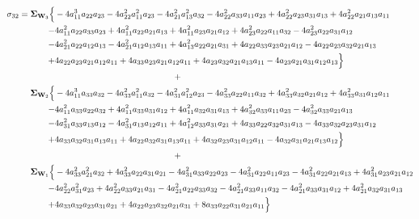 \documentclass{article}
\begin{document}
\begin{equation}
\begin{aligned}
\sigma_{32} =  \mathbf{\Sigma}_{\textbf{W}_{3}} \Bigl\{ & -4 a_{11}^{3} a_{22} a_{23} - 4 a_{22}^{2} a_{11}^{2} a_{23} - 4 a_{21}^{2} a_{13}^{2} a_{32} - 4 a_{22}^{2} a_{33} a_{11} a_{23} + 4 a_{22}^{2} a_{23} a_{31} a_{13} + 4 a_{22}^{2} a_{21} a_{13} a_{11} \\
-&4 a_{11}^{2} a_{22} a_{33} a_{23} + 4 a_{11}^{2} a_{22} a_{21} a_{13} + 4 a_{11}^{2} a_{23} a_{21} a_{12} + 4 a_{23}^{2} a_{22} a_{11} a_{32} - 4a_{23}^{2} a_{22} a_{31} a_{12} \\
-&4 a_{21}^{2} a_{22} a_{12} a_{13} - 4 a_{21}^{2} a_{12} a_{13} a_{11} + 4 a_{13}^{2} a_{22} a_{21} a_{31} + 4 a_{22} a_{33} a_{23} a_{21} a_{12} - 4 a_{22} a_{23}a_{32} a_{21} a_{13} \\
+&4 a_{22} a_{23} a_{21} a_{12} a_{11} + 4 a_{33} a_{23} a_{21} a_{12} a_{11} + 4 a_{23} a_{32} a_{21} a_{13} a_{11} - 4 a_{23} a_{21} a_{31} a_{12} a_{13}\Bigr\} \\
& \qquad \qquad \qquad \qquad \qquad \qquad \qquad + \\
\mathbf{\Sigma}_{\textbf{W}_{2}} \Bigl\{& -4 a_{11}^{3} a_{33} a_{32} - 4 a_{33}^{2} a_{11}^{2} a_{32} - 4 a_{31}^{2} a_{12}^{2} a_{23} - 4 a_{33}^{2} a_{22} a_{11} a_{32} + 4 a_{33}^{2} a_{32} a_{21} a_{12} + 4 a_{33}^{2} a_{31} a_{12} a_{11} \\
-&4 a_{11}^{2} a_{33} a_{22} a_{32} + 4 a_{11}^{2} a_{33} a_{31} a_{12} + 4 a_{11}^{2} a_{32} a_{31} a_{13} + 4 a_{32}^{2} a_{33} a_{11} a_{23} - 4 a_{32}^{2} a_{33} a_{21} a_{13} \\
-&4 a_{31}^{2} a_{33} a_{13} a_{12} - 4 a_{31}^{2} a_{13} a_{12} a_{11} + 4 a_{12}^{2} a_{33} a_{31} a_{21} + 4 a_{33} a_{22} a_{32} a_{31} a_{13} - 4 a_{33} a_{32} a_{23} a_{31} a_{12} \\
+&4 a_{33} a_{32} a_{31} a_{13} a_{11} + 4 a_{22} a_{32} a_{31} a_{13} a_{11} + 4 a_{32} a_{23} a_{31} a_{12} a_{11} - 4 a_{32} a_{31} a_{21} a_{13} a_{12}\Bigr\} \\
& \qquad \qquad \qquad \qquad \qquad \qquad \qquad + \\
\mathbf{\Sigma}_{\textbf{W}_{1}} \Bigl\{& -4a_{33}^{2} a_{21}^{2} a_{32} + 4 a_{33}^{2} a_{22} a_{31} a_{21} - 4 a_{31}^{2} a_{33} a_{22} a_{23} - 4 a_{31}^{2} a_{22} a_{11} a_{23} - 4 a_{31}^{2} a_{22} a_{21} a_{13} + 4 a_{31}^{2} a_{23} a_{21} a_{12} \\
-&4 a_{22}^{2} a_{31}^{2} a_{23} + 4 a_{22}^{2} a_{33} a_{21} a_{31} - 4 a_{21}^{2} a_{22} a_{33} a_{32} - 4 a_{21}^{2} a_{33} a_{11} a_{32} - 4 a_{21}^{2} a_{33} a_{31} a_{12} + 4 a_{21}^{2} a_{32} a_{31} a_{13} \\
+&4 a_{33} a_{32} a_{23} a_{31} a_{21} + 4 a_{22} a_{23} a_{32} a_{21} a_{31} + 8 a_{33} a_{22} a_{31} a_{21} a_{11}\Bigr\}
\end{aligned}
\label{eq:network3by3_sigma32}
\end{equation}
\end{document}
